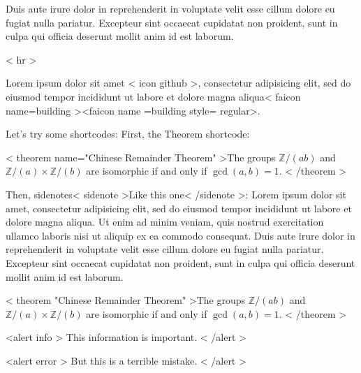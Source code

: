 \documentclass[12pt]{article}
\theoremstyle{TheoremStyle}
\begin{document}
	

\begin{markdown}
Duis aute irure dolor in reprehenderit in voluptate velit esse cillum dolore eu fugiat nulla pariatur. Excepteur sint occaecat cupidatat non proident, sunt in culpa qui officia deserunt mollit anim id est laborum. 
    
{{< hr >}}
    
    
Lorem ipsum dolor sit amet {{< icon github >}}, consectetur adipisicing elit, sed do eiusmod tempor incididunt ut labore et dolore magna aliqua{{< faicon name=building  >}}{{<faicon name =building style=   regular>}}.
    
Let's try some shortcodes: First, the Theorem shortcode:

{{< theorem name="Chinese Remainder Theorem" >}}The groups $\mathbb{Z}/(ab)$ and $\mathbb{Z}/(a)\times \mathbb{Z}/(b)$ are isomorphic if and only if $\gcd(a,b)=1$.
{{< /theorem >}}

Then, sidenotes{{< sidenote >}}Like this one{{< /sidenote >}}: Lorem ipsum dolor sit amet, consectetur adipisicing elit, sed do eiusmod tempor incididunt ut labore et dolore magna aliqua. Ut enim ad minim veniam, quis nostrud exercitation ullamco laboris nisi ut aliquip ex ea commodo consequat. Duis aute irure dolor in reprehenderit in voluptate velit esse cillum dolore eu fugiat nulla pariatur. Excepteur sint occaecat cupidatat non proident, sunt in culpa qui officia deserunt mollit anim id est laborum. 

{{< theorem "Chinese Remainder Theorem" >}}The groups $\mathbb{Z}/(ab)$ and $\mathbb{Z}/(a)\times \mathbb{Z}/(b)$ are isomorphic if and only if $\gcd(a,b)=1$.
{{< /theorem >}}


{{<alert info >}}
This information is important.
{{< /alert >}}


{{<alert error >}}
But this is a terrible mistake.
{{< /alert >}}



\end{markdown}

    

\end{document}
